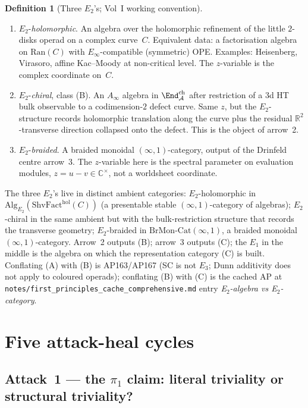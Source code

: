 \documentclass[11pt]{article}
\theoremstyle{definition}
\newtheorem{defn}[thm]{Definition}
\theoremstyle{remark}
\newcommand{\bC}{\mathbb{C}}
\newcommand{\bR}{\mathbb{R}}
\newcommand{\cA}{\mathcal{A}}
\newcommand{\Eone}{E_1}
\newcommand{\Etwo}{E_2}
\newcommand{\Ethree}{E_3}
\newcommand{\Einf}{E_\infty}
\newcommand{\Ran}{\mathrm{Ran}}
\begin{document}
\begin{defn}[Three $\Etwo$'s; Vol~I working convention]
\label{def:three-e2}
\begin{enumerate}[label=\textup{(\Alph*)}]
\item $\Etwo$-\emph{holomorphic}. An algebra over the holomorphic
 refinement of the little $2$-disks operad on a complex curve~$C$.
 Equivalent data: a factorisation algebra on $\Ran(C)$ with
 $\Einf$-compatible (symmetric) OPE. Examples: Heisenberg,
 Virasoro, affine Kac--Moody at non-critical level. The
 $z$-variable is the complex coordinate on~$C$.
\item $\Etwo$-\emph{chiral}, class \textup{(B)}. An $A_\infty$
 algebra in $\End^{\mathrm{ch}}_\cA$ after restriction of a
 $3$d HT bulk observable to a codimension-$2$ defect curve.
 Same $z$, but the $\Etwo$-structure records holomorphic
 translation along the curve plus the residual
 $\bR^2$-transverse direction collapsed onto the defect. This is
 the object of arrow~2.
\item $\Etwo$-\emph{braided}. A braided monoidal $(\infty,1)$-category,
 output of the Drinfeld centre arrow~3. The $z$-variable here is
 the spectral parameter on evaluation modules,
 $z = u - v \in \bC^\times$, not a worldsheet coordinate.
\end{enumerate}
\end{defn}

The three $\Etwo$'s live in distinct ambient categories:
$\Etwo$-holomorphic in $\mathrm{Alg}_{\Etwo}(\mathrm{ShvFact}^{\mathrm{hol}}(C))$
(a presentable stable $(\infty,1)$-category of algebras);
$\Etwo$-chiral in the same ambient but with the bulk-restriction
structure that records the transverse geometry;
$\Etwo$-braided in
$\mathrm{BrMon}\text{-Cat}(\infty,1)$, a braided
monoidal $(\infty,1)$-category. Arrow~2 outputs (B); arrow~3
outputs (C); the $\Eone$ in the middle is the algebra on which the
representation category (C) is built. Conflating (A) with (B) is
AP163/AP167 (SC is not $\Ethree$; Dunn additivity does not apply
to coloured operads); conflating (B) with (C) is the cached AP at
\texttt{notes/first\_principles\_cache\_comprehensive.md} entry
\textit{E$_2$-algebra vs E$_2$-category}.

\section{Five attack-heal cycles}

\subsection*{Attack~1 --- the $\pi_1$ claim: literal triviality or
structural triviality?}
\end{document}
